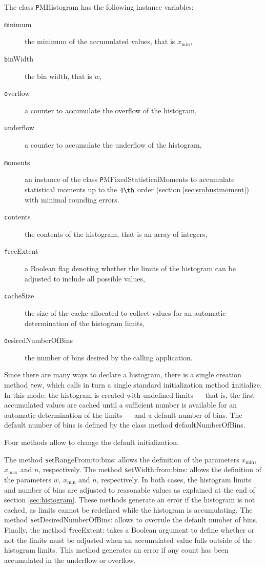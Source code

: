 \noindent The class {\texttt PMHistogram} has the following instance
variables:
\begin{description}
  \item[\texttt minimum] the minimum of the accumulated values, that
  is $x_{\min}$,
  \item[\texttt binWidth] the bin width, that is $w$,
  \item[\texttt overflow] a counter to accumulate the overflow of the histogram,
  \item[\texttt underflow] a counter to accumulate the underflow of the histogram,
  \item[\texttt moments] an instance of the class {\texttt
  PMFixedStatisticalMoments} to accumulate statistical moments up
  to the $4\th$ order (\cf section \ref{sec:srobustmoment}) with
  minimal rounding errors.
  \item[\texttt contents] the contents of the histogram, that is an
  array of integers,
  \item[\texttt freeExtent] a Boolean flag denoting whether the limits
  of the histogram can be adjusted to include all possible values,
  \item[\texttt cacheSize] the size of the cache allocated to collect
  values for an automatic determination of the histogram limits,
  \item[\texttt desiredNumberOfBins] the number of bins desired by the
  calling application.
\end{description}

Since there are many ways to declare a histogram, there is a
single creation method {\texttt new}, which calls in turn a single
standard initialization method {\texttt initialize}. In this mode. the
histogram is created with undefined limits --- that is, the first
accumulated values are cached until a sufficient number is
available for an automatic determination of the limits --- and a
default number of bins. The default number of bins is defined by
the class method {\texttt defaultNumberOfBins}.

\noindent Four methods allow to change the default initialization.

The method {\texttt setRangeFrom:to:bins:} allows the definition of
the parameters $x_{\min}$, $x_{\max}$ and $n$, respectively. The
method {\texttt setWidth:from:bins:} allows the definition of the
parameters $w$, $x_{\min}$ and $n$, respectively. In both cases,
the histogram limits and number of bins are adjusted to reasonable
values as explained at the end of section \ref{sec:histogram}.
These methods generate an error if the histogram is not cached, as
limits cannot be redefined while the histogram is accumulating.
The method {\texttt setDesiredNumberOfBins:} allows to overrule the
default number of bins. Finally, the method {\texttt freeExtent:}
takes a Boolean argument to define whether or not the limits must
be adjusted when an accumulated value falls outside of the
histogram limits. This method generates an error if any count has
been accumulated in the underflow or overflow.

